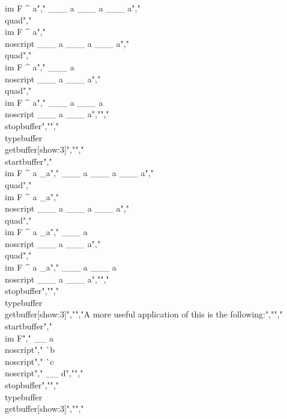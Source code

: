 im { F ^ {a}","    ___ {a} ___ {a} ___ {a}","} \\quad","\\im { F ^ {a}","    \\noscript ___ {a} ___ {a} ___ {a}","} \\quad","\\im { F ^ {a}","    ___ {a} \\noscript ___ {a} ___ {a}","} \\quad","\\im { F ^ {a}","    ___ {a}  ___ {a} \\noscript ___ {a} ___ {a}","}","\\stopbuffer","","\\typebuffer \\getbuffer[show:3]","","\\startbuffer","\\im { F ^ {a} _{a}","    ___ {a} ___ {a} ___ {a}","} \\quad","\\im { F ^ {a} _{a}","    \\noscript ___ {a} ___ {a} ___ {a}","} \\quad","\\im { F ^ {a} _{a}","    ___ {a} \\noscript ___ {a} ___ {a}","} \\quad","\\im { F ^ {a} _{a}","    ___ {a}  ___ {a} \\noscript ___ {a} ___ {a}","}","\\stopbuffer","","\\typebuffer \\getbuffer[show:3]","","A more useful application of this is the following:","","\\startbuffer","\\im {F","    __ {a} \\noscript","    ^^ {b} \\noscript","    ^^ {c} \\noscript","    __ {d}","}","\\stopbuffer","","\\typebuffer \\getbuffer[show:3]","","%